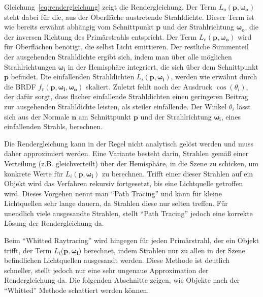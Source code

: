 Gleichung~\ref{eq:rendergleichung} zeigt die Rendergleichung. Der Term \( L_o(\boldsymbol{p}, \boldsymbol{\omega_o}) \) steht dabei für die, aus der Oberfläche austretende Strahldichte. Dieser Term ist wie bereits erwähnt abhängig vom Schnittpunkt \( \boldsymbol{p} \) und der Strahlrichtung \( \boldsymbol{\omega_o} \), die der inversen Richtung des Primärstrahls entspricht. Der Term \( L_e(\boldsymbol{p}, \boldsymbol{\omega_o}) \) wird für Oberflächen benötigt, die selbst Licht emittieren. Der restliche Summenteil der ausgehenden Strahldichte ergibt sich, indem man über alle möglichen Strahlrichtungen \( \boldsymbol{\omega_i} \) in der Hemisphäre integriert, die sich über dem Schnittpunkt \( \boldsymbol{p} \) befindet. Die einfallenden Strahldichten \( L_i(\boldsymbol{p}, \boldsymbol{\omega_i}) \), werden wie erwähnt durch die BRDF \( f_r(\boldsymbol{p}, \boldsymbol{\omega_i}, \boldsymbol{\omega_o}) \) skaliert. Zuletzt fehlt noch der Ausdruck \( \cos(\theta_i) \), der dafür sorgt, dass flacher einfallende Strahldichten einen geringeren Beitrag zur ausgehenden Strahldichte leisten, als steiler einfallende. Der Winkel \( \theta_i \) lässt sich aus der Normale \( \boldsymbol{n} \) am Schnittpunkt \( \boldsymbol{p} \) und der Strahlrichtung \( \boldsymbol{\omega_i} \), eines einfallenden Strahls, berechnen.

Die Rendergleichung kann in der Regel nicht analytisch gelöst werden und muss daher approximiert werden. Eine Variante besteht darin, Strahlen gemäß einer Verteilung (z.B. gleichverteilt) über der Hemisphäre, in die Szene zu schicken, um konkrete Werte für \( L_i(\boldsymbol{p}, \boldsymbol{\omega_i}) \) zu berechnen. Trifft einer dieser Strahlen auf ein Objekt wird das Verfahren rekursiv fortgesetzt, bis eine Lichtquelle getroffen wird. Dieses Vorgehen nennt man "`Path Tracing"' und kann für kleine Lichtquellen sehr lange dauern, da Strahlen diese nur selten treffen. Für unendlich viele ausgesandte Strahlen, stellt "`Path Tracing"' jedoch eine korrekte Lösung der Rendergleichung da.

Beim "`Whitted Raytracing"' wird hingegen für jeden Primärstrahl, der ein Objekt trifft, der Term \( L_i(\boldsymbol{p}, \boldsymbol{\omega_i)} \) berechnet, indem Strahlen nur zu allen in der Szene befindlichen Lichtquellen ausgesandt werden. Diese Methode ist deutlich schneller, stellt jedoch nur eine sehr ungenaue Approximation der Rendergleichung da. Die folgenden Abschnitte zeigen, wie Objekte nach der "`Whitted"' Methode schattiert werden können.


